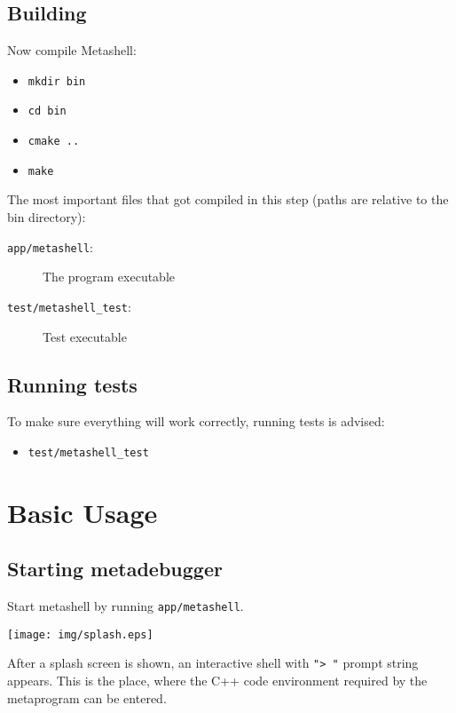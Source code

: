 \subsection{Building}

Now compile Metashell:

\begin{itemize}
    \item \texttt{mkdir bin}
    \item \texttt{cd bin}
    \item \texttt{cmake ..}
    \item \texttt{make}
\end{itemize}

The most important files that got compiled in this step (paths are relative to
the bin directory):

\begin{description}
    \item[\texttt{app/metashell}:] The program executable
    \item[\texttt{test/metashell\_test}:] Test executable
\end{description}

\subsection{Running tests}

To make sure everything will work correctly, running tests is advised:

\begin{itemize}
    \item \texttt{test/metashell\_test}
\end{itemize}

\section{Basic Usage\cite{github}} %

\subsection{Starting metadebugger}

Start metashell by running \texttt{app/metashell}.

\texttt{[image: img/splash.eps]}

After a splash screen is shown, an interactive shell with \texttt{"> "}
prompt string appears. This is the place, where the C++ code environment
required by the metaprogram can be entered.

